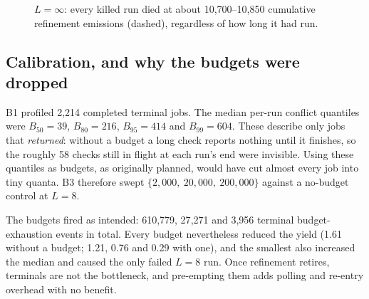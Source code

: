 \documentclass[11pt,a4paper]{article}
\begin{document}
\begin{figure}[h]\centering
{}
\caption{$L=\infty$: every killed run died at about 10{,}700--10{,}850 cumulative refinement
emissions (dashed), regardless of how long it had run.}
\label{fig:oom}
\end{figure}

\subsection{Calibration, and why the budgets were dropped}

B1 profiled 2{,}214 completed terminal jobs. The median per-run conflict quantiles were
$B_{50}=39$, $B_{80}=216$, $B_{95}=414$ and $B_{99}=604$. These describe only jobs that
\emph{returned}: without a budget a long check reports nothing until it finishes, so the roughly 58
checks still in flight at each run's end were invisible. Using these quantiles as budgets, as
originally planned, would have cut almost every job into tiny quanta. B3 therefore swept
$\{2{,}000,\ 20{,}000,\ 200{,}000\}$ against a no-budget control at $L=8$.

The budgets fired as intended: 610{,}779, 27{,}271 and 3{,}956 terminal budget-exhaustion events in
total. Every budget nevertheless reduced the yield (1.61 without a budget; 1.21, 0.76 and 0.29 with
one), and the smallest also increased the median and caused the only failed $L=8$ run. Once
refinement retires, terminals are not the bottleneck, and pre-empting them adds polling and re-entry
overhead with no benefit.
\end{document}
